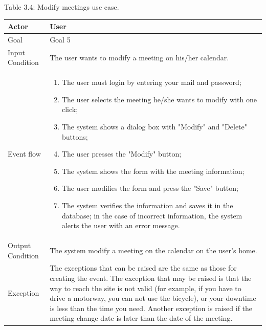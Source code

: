 \documentclass{article}
\begin{document}
	\begin{center}
		Table 3.4: Modify meetings use case.
		
		\bigskip
    		\begin{tabular}{p{}|p{}}
   			\hline
    			Actor & User \\ \hline
    			Goal &  Goal 5 \\ \hline
    			Input Condition & The user wants to modify a meeting on his/her calendar. \\ \hline
			Event flow & 
			\begin{enumerate}
  				\item The user must login by entering your mail and password;
  				\item The user selects the meeting he/she wants to modify with one click;
  				\item The system shows a dialog box with "Modify" and "Delete" buttons;
  				\item The user presses the "Modify" button;
  				\item The system shows the form with the meeting information;
  				\item The user modifies the form and press the "Save" button;
  				\item The system verifies the information and saves it in the database; in the case of incorrect information, the system alerts the user with an error message.
 			 \end{enumerate} \\ \hline
    			Output Condition & The system modify a meeting on the calendar on the user's home. \\ \hline
    			Exception & The exceptions that can be raised are the same as those for creating the event. The exception that may be raised is that the way to reach the site is not valid (for example, if you have to drive a motorway, you can not use the bicycle), or your downtime is less than the time you need. Another exception is raised if the meeting change date is later than the date of the meeting. \\ \hline
    		\end{tabular}
	\end{center}
	
\end{document}
